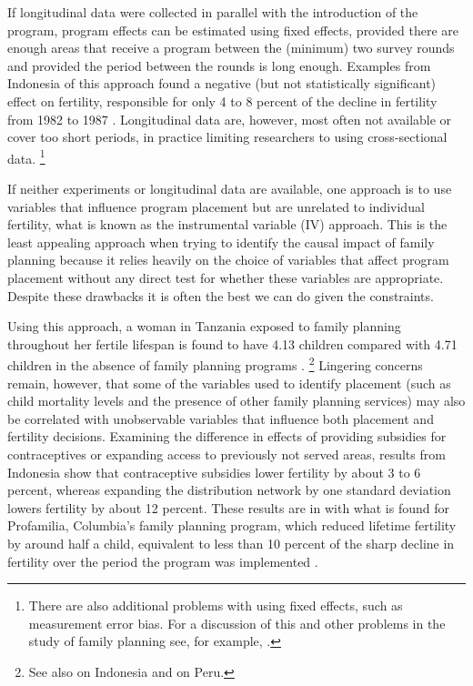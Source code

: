 \documentclass[letterpaper,12pt]{article}
\begin{document}
If longitudinal data were collected in parallel with the introduction of the 
program, program effects can be estimated using fixed effects, provided there
are enough areas that receive a program between the (minimum) 
two survey rounds and provided the period between the rounds is long 
enough.
Examples from Indonesia of this approach found a negative (but not statistically 
significant) effect on fertility, responsible for only 4 to 8 percent of the 
decline in fertility from 1982 to 1987 \citep{pitt93,Gertler1994}.
Longitudinal data are, however, most often not available or cover too short 
periods, in practice limiting researchers to using cross-sectional data.%
\footnote{%
There are also additional problems with using fixed effects, such as measurement error 
bias.
For a discussion of this and other problems in the study of family planning
see, for example, \cite{angeles98}.
}

If neither experiments or longitudinal data are available, one approach is to use 
variables that influence program placement but are unrelated to individual fertility,
what is known as the instrumental variable (IV) approach.
This is the least appealing approach when trying to identify the causal
impact of family planning because it relies heavily on the choice of
variables that affect program placement without any direct test for whether
these variables are appropriate.
Despite these drawbacks it is often the best we can do given the constraints.

Using this approach, a woman in Tanzania exposed to family planning throughout 
her fertile lifespan is found to have 4.13 children compared with 4.71 children 
in the absence of family planning programs \citep{angeles98}.%
\footnote{
See also \citet{Angeles2005} on Indonesia and \citep{Angeles2005a} on Peru.
}
Lingering concerns remain, however, that some of the variables used to identify placement
(such as child mortality levels and the presence of other family planning services)
may also be correlated with unobservable variables that influence 
both placement and fertility decisions.
Examining the difference in effects of providing subsidies for contraceptives
or expanding access to previously not served areas, results from Indonesia
show that contraceptive subsidies lower fertility by about 3 to 6 percent,
whereas expanding the distribution network by one standard deviation 
lowers fertility by about 12 percent\citep{Molyneaux2000}.
These results are in with what is found for Profamilia, Columbia's family 
planning program, which reduced lifetime fertility by around 
half a child, equivalent to less than 10 percent of the sharp decline in fertility 
over the period the program was implemented \citep{Miller2010}.
\end{document}
